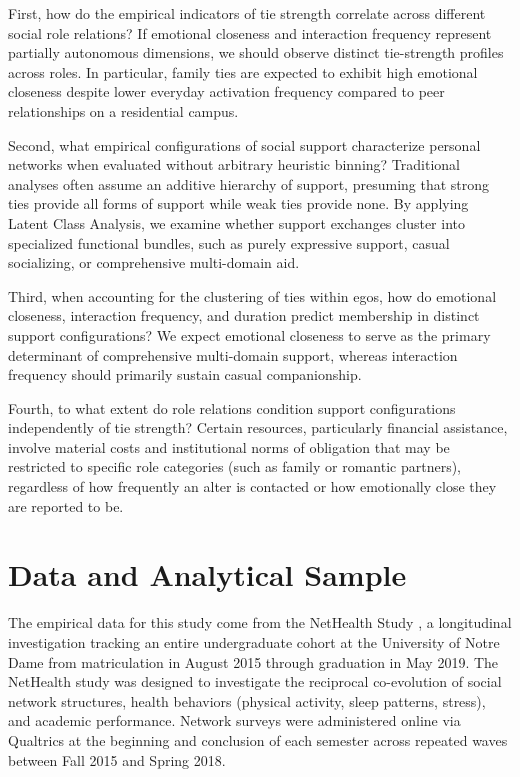 \documentclass[12pt]{article}
\begin{document}
First, how do the empirical indicators of tie strength correlate across different social role relations? If emotional closeness and interaction frequency represent partially autonomous dimensions, we should observe distinct tie-strength profiles across roles. In particular, family ties are expected to exhibit high emotional closeness despite lower everyday activation frequency compared to peer relationships on a residential campus.

Second, what empirical configurations of social support characterize personal networks when evaluated without arbitrary heuristic binning? Traditional analyses often assume an additive hierarchy of support, presuming that strong ties provide all forms of support while weak ties provide none. By applying Latent Class Analysis, we examine whether support exchanges cluster into specialized functional bundles, such as purely expressive support, casual socializing, or comprehensive multi-domain aid.

Third, when accounting for the clustering of ties within egos, how do emotional closeness, interaction frequency, and duration predict membership in distinct support configurations? We expect emotional closeness to serve as the primary determinant of comprehensive multi-domain support, whereas interaction frequency should primarily sustain casual companionship.

Fourth, to what extent do role relations condition support configurations independently of tie strength? Certain resources, particularly financial assistance, involve material costs and institutional norms of obligation that may be restricted to specific role categories (such as family or romantic partners), regardless of how frequently an alter is contacted or how emotionally close they are reported to be.

\section{Data and Analytical Sample}

The empirical data for this study come from the NetHealth Study \citep[e.g.,][]{liu2018network, sepulvado2020predicting, wang2020neither}, a longitudinal investigation tracking an entire undergraduate cohort at the University of Notre Dame from matriculation in August 2015 through graduation in May 2019. The NetHealth study was designed to investigate the reciprocal co-evolution of social network structures, health behaviors (physical activity, sleep patterns, stress), and academic performance. Network surveys were administered online via Qualtrics at the beginning and conclusion of each semester across repeated waves between Fall 2015 and Spring 2018.
\end{document}
